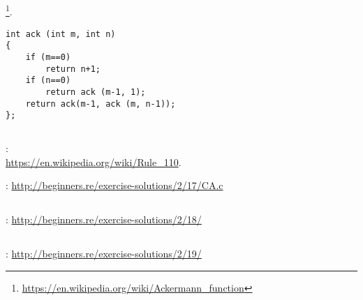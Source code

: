 \subsection{}

\footnote{\url{https://en.wikipedia.org/wiki/Ackermann_function}}.

\begin{lstlisting}
int ack (int m, int n)
{
	if (m==0)
		return n+1;
	if (n==0)
		return ack (m-1, 1);
	return ack(m-1, ack (m, n-1));
};
\end{lstlisting}

\subsection{}

:\\
\url{https://en.wikipedia.org/wiki/Rule_110}.

\Sourcecode: \url{http://beginners.re/exercise-solutions/2/17/CA.c}

\subsection{}

\Sourcecode: \url{http://beginners.re/exercise-solutions/2/18/}

\subsection{}

\Sourcecode: \url{http://beginners.re/exercise-solutions/2/19/}

